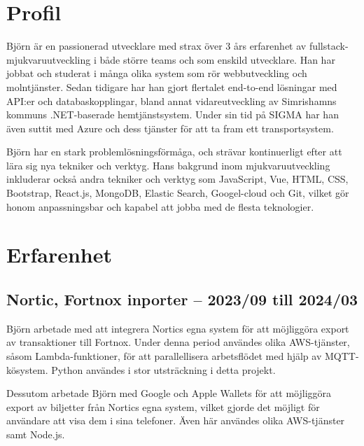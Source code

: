 \documentclass{article}
\begin{document}
\noindent
\begin{minipage}[t]{0.7\textwidth}
\vspace{-20pt} %
\section*{\textcolor{colorBlue}{Profil}}
Björn är en passionerad utvecklare med strax över 3 års erfarenhet av fullstack-
mjukvaruutveckling i både större teams och som enskild utvecklare. 
Han har jobbat och studerat i många olika system som rör webbutveckling och molntjänster. 
Sedan tidigare har han gjort flertalet end-to-end lösningar med API:er och databaskopplingar, 
bland annat vidareutveckling av Simrishamns kommuns .NET-baserade hemtjänstsystem. 
Under sin tid på SIGMA har han även suttit med Azure och dess tjänster för att ta fram ett transportsystem.

\vspace{10pt}
Björn har en stark problemlösningsförmåga, och strävar kontinuerligt efter att lära 
sig nya tekniker och verktyg. Hans bakgrund inom mjukvaruutveckling inkluderar 
också andra tekniker och verktyg som JavaScript, Vue, HTML, CSS, Bootstrap, React.js, MongoDB,
 Elastic Search, Googel-cloud och Git, vilket gör honom anpassningsbar och 
 kapabel att jobba med de flesta teknologier.

\vspace{10pt} %
\section*{\textcolor{colorBlue}{Erfarenhet}}

\subsection*{\textcolor{colorTitelErfarenhet}{Nortic, Fortnox inporter – 2023/09 till 2024/03}}
Björn arbetade med att integrera Nortics egna system för att möjliggöra export av transaktioner till Fortnox. Under denna period användes olika AWS-tjänster, såsom Lambda-funktioner, för att parallellisera arbetsflödet med hjälp av MQTT-kösystem. Python användes i stor utsträckning i detta projekt.
                       
Dessutom arbetade Björn med Google och Apple Wallets för att möjliggöra export av biljetter från Nortics egna system, vilket gjorde det möjligt för användare att visa dem i sina telefoner. Även här användes olika AWS-tjänster samt Node.js.


\end{minipage}
\end{document}
